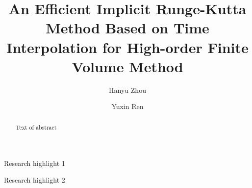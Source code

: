 \documentclass[preprint,12pt]{elsarticle}
\begin{document}
\begin{frontmatter}


    \title{An Efficient Implicit Runge-Kutta Method
        Based on Time Interpolation
        for High-order Finite Volume Method}




    \author[THUDEM]{Hanyu Zhou}
    \author[THUDEM]{Yuxin Ren}




    \begin{abstract}
        Text of abstract

    \end{abstract}


    \begin{highlights}
        \item Research highlight 1
        \item Research highlight 2
    \end{highlights}


\end{frontmatter}
\end{document}
